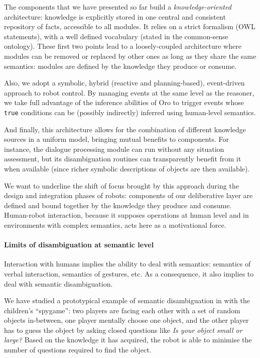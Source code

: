 \documentclass[preprint,3p,times]{elsarticle}
\begin{document}
The components that we have presented so far build a \emph{knowledge-oriented}
architecture: knowledge is explicitly stored in one central and consistent
repository of facts, accessible to all modules. It relies on a strict formalism
(OWL statements), with a well defined vocabulary (stated in the common-sense
ontology). These first two points lead to a loosely-coupled architecture
where modules can be removed or replaced by other ones as long as they
share the same semantics: modules are defined by the knowledge they produce or
consume.

Also, we adopt a symbolic, hybrid (reactive and planning-based), event-driven
approach to robot control. By managing events at the same level as the reasoner,
we take full advantage of the inference abilities of {\sc Oro} to trigger events
whose \texttt{true} conditions can be (possibly indirectly) inferred using
human-level semantics.

And finally, this architecture allows for the combination of different
knowledge sources in a uniform model, bringing mutual
benefits to components. For instance, the dialogue processing module can
run without any situation assessment, but its disambiguation routines
can transparently benefit from it when available (since richer symbolic
descriptions of objects are then available).

We want to underline the
shift of focus brought by this approach during the design and integration phases
of robots: components of our deliberative layer are defined and bound together
by the knowledge they produce and consume. Human-robot interaction, because it
supposes operations at human level and in environments with complex
semantics, acts here as a motivational force.


\paragraph{Limits of disambiguation at semantic level}

Interaction with humans implies the ability to deal with semantics: semantics of
verbal interaction, semantics of gestures, etc.  As a consequence, it also
implies to deal with semantic disambiguation.

We have studied a prototypical example of semantic disambiguation in
\cite{Ros2010b} with the children's ``spygame'': two players are facing
each other with a set of random objects in-between, one player mentally choose
one object, and the other player has to guess the object by asking closed
questions like \emph{Is your object small or large?} Based on the knowledge it
has acquired, the robot is able to minimise the number of questions required to
find the object.
\end{document}
